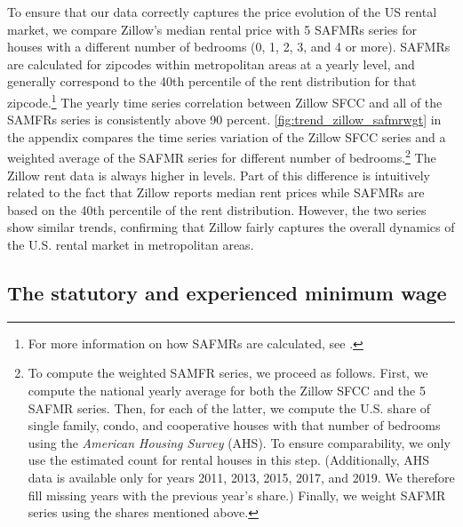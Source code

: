 To ensure that our data correctly captures the price evolution of the US rental market, 
we compare Zillow's median rental price with 5 SAFMRs series for houses with a different 
number of bedrooms (0, 1, 2, 3, and 4 or more). SAFMRs are calculated for zipcodes within 
metropolitan areas at a yearly level, and generally correspond to the 40th percentile of 
the rent distribution for that zipcode.\footnote{For more information on how SAFMRs are 
	calculated, see \textcite[][page 41641]{hudPreamble}.} 
The yearly time series correlation between Zillow SFCC and all of the SAMFRs series is 
consistently above 90 percent. \autoref{fig:trend_zillow_safmrwgt} in the appendix 
compares the time series variation of the Zillow SFCC series and a weighted average of 
the SAFMR series for different number of bedrooms.\footnote{
	\label{foot:zillow_time_series}
	To compute the weighted SAMFR series, we proceed as follows. First, we compute the 
	national yearly average for both the Zillow SFCC and the 5 	SAFMR series. Then, for 
	each of the latter, we compute the U.S. share of single family, condo, and cooperative 
	houses with that number of bedrooms using the \textit{American Housing Survey} (AHS). 
	To ensure comparability, we only use the estimated count for rental houses in this 
	step. (Additionally, AHS data is available only for years 2011, 2013, 2015, 2017, and 
	2019. We therefore fill missing years with the previous year's share.) Finally, we weight 
	SAFMR series using the shares mentioned above.} 
The Zillow rent data is always higher in levels. Part of this difference is intuitively 
related to the fact that Zillow reports median rent prices while SAFMRs are based on the 
40th percentile of the rent distribution. However, the two series show similar trends, 
confirming that Zillow fairly captures the overall dynamics of the U.S. rental 
market in metropolitan areas.

\subsection{The statutory and experienced minimum wage}\label{sec:mw_construction}

